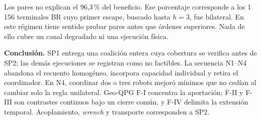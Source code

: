 Los pares no explican el 96,3\,\% del beneficio. Ese porcentaje corresponde a
los 1\,156 terminales BR cuyo primer escape, buscado hasta $h=3$, fue bilateral.
En este régimen tiene sentido probar pares antes que órdenes superiores. Nada de
ello cubre un canal degradado ni una ejecución física.

\begin{tcolorbox}[colback=SPFloor,colframe=VIUOrange,boxrule=.7pt,arc=1mm,
 left=2.3mm,right=2.3mm,top=1.2mm,bottom=1.2mm]
\footnotesize
\textbf{Conclusión.} SP1 entrega una coalición entera cuya cobertura se verifica
antes de SP2; las demás ejecuciones se registran como no factibles. La secuencia
N1--N4 abandona el recuento homogéneo, incorpora capacidad individual y retira
el coordinador. En N4, coordinar dos o tres robots mejoró mínimos que no cedían
al cambiar solo la regla unilateral. Geo-QPG F-I concentra la aportación; F-II y
F-III son contrastes continuos bajo un cierre común, y F-IV delimita la extensión
temporal. Acoplamiento, \emph{wrench} y transporte corresponden a SP2.
\end{tcolorbox}
